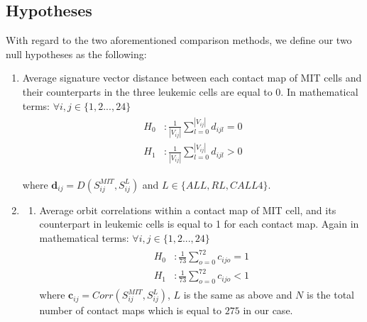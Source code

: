 \documentclass[a4,center,fleqn]{NAR}
\begin{document}
\subsection{Hypotheses}

With regard to the two aforementioned comparison methods, we define
our two null hypotheses as the following:

\begin{enumerate}
    \item Average signature vector distance between each 
        contact map of MIT cells and
        their counterparts in the three leukemic cells
        are equal to $0$. In mathematical terms:
        $\forall i,j \in \{1, 2 ..., 24\}$
        \begin{align}
            \begin{split}
                H_0&: \frac{1}{|V_{ij}|}\sum_{l=0}^{|V_{ij}|}{d_{ijl}} = 0 \\
                H_1&: \frac{1}{|V_{ij}|}\sum_{l=0}^{|V_{ij}|}{d_{ijl}} > 0
            \end{split}
            \label{eq:h1}
        \end{align}

        where 
        $\mathbf{d}_{ij} = D(S^{MIT}_{ij}, S^L_{ij})$ and $L \in \{ALL, RL, CALL4\}$.

        \item 
            \begin{enumerate}
                \item Average orbit correlations within a contact map of MIT cell, 
                    and its counterpart in leukemic cells is equal to 1
                    for each contact map.
                Again in mathematical terms:
                $\forall i,j \in \{1, 2 ..., 24\}$
                \begin{align}
                    \begin{split}
                        H_0&: \frac{1}{73}\sum_{o=0}^{72}{c_{ijo}} = 1 \\
                        H_1&: \frac{1}{73}\sum_{o=0}^{72}{c_{ijo}} < 1
                    \end{split}
                    \label{eq:h2b}
                \end{align}
                        where $\mathbf{c}_{ij} = Corr(S^{MIT}_{ij}, S^L_{ij})$, $L$ 
                        is the same as above and $N$ 
                        is the total number of contact maps which 
                        is equal to $275$ in our case.


\end{enumerate}
\end{enumerate}
\end{document}
